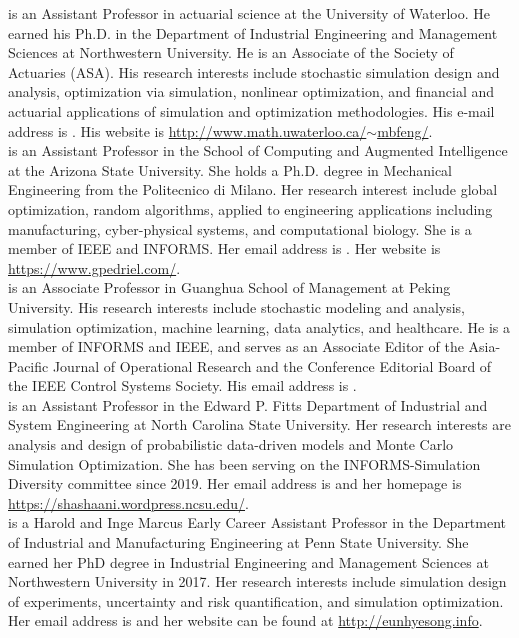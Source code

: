 \documentclass{wscpaperproc}
\theoremstyle{wsc}
\begin{document}
 is an Assistant Professor in actuarial science at the University of Waterloo. He earned his Ph.D. in the Department of Industrial Engineering and Management Sciences at Northwestern University. He is an Associate of the Society of Actuaries (ASA). His research interests include stochastic simulation design and analysis, optimization via simulation, nonlinear optimization, and financial and actuarial applications of simulation and optimization methodologies. His e-mail address is . His website is \href{http://www.math.uwaterloo.ca/~mbfeng/}{http://www.math.uwaterloo.ca/$\sim$mbfeng/}.\\

 is an Assistant Professor in the School of Computing and Augmented Intelligence at the Arizona State University. She holds a Ph.D. degree in Mechanical Engineering from the Politecnico di Milano. Her research interest include global optimization, random algorithms, applied to engineering applications including manufacturing, cyber-physical systems, and computational biology. She is a member of IEEE and INFORMS. Her email address is . Her website is \url{https://www.gpedriel.com/}.\\

 is an Associate Professor in Guanghua School of Management at Peking University. His research interests include stochastic modeling and analysis, simulation optimization, machine learning, data analytics, and healthcare. He is a member of INFORMS and IEEE, and serves as an Associate Editor of the Asia-Pacific Journal of Operational Research and  the Conference Editorial Board of the IEEE Control Systems Society. His email address is .\\

 is an Assistant Professor in the Edward P. Fitts Department of Industrial and System Engineering at North Carolina State University. Her research interests are analysis and design of probabilistic data-driven models and Monte Carlo Simulation Optimization. She has been serving on the INFORMS-Simulation Diversity committee since 2019. Her email address is  and her homepage is \url{https://shashaani.wordpress.ncsu.edu/}.\\

 is a Harold and Inge Marcus Early Career Assistant Professor in the Department of Industrial and Manufacturing Engineering at Penn State University. She earned her PhD degree in Industrial Engineering and Management Sciences at Northwestern University in 2017. Her research interests include simulation design of experiments, uncertainty and risk quantification, and simulation optimization. Her email address is  and her website can be found at \href{http://eunhyesong.info}{http://eunhyesong.info}.\\
\end{document}
